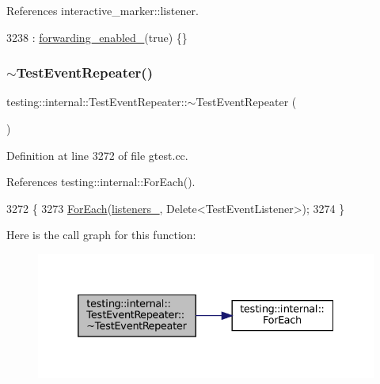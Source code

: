 References interactive\+\_\+marker\+::listener.


\begin{DoxyCode}
3238 : \hyperlink{classtesting_1_1internal_1_1TestEventRepeater_a1f7e494642d653eaad800504510d18a3}{forwarding\_enabled\_}(\textcolor{keyword}{true}) \{\}
\end{DoxyCode}
\mbox{\label{classtesting_1_1internal_1_1TestEventRepeater_a0f7129002fc4a33e29ce76a3b6df8d1b}} 
\subsubsection{\texorpdfstring{$\sim$\+Test\+Event\+Repeater()}{~TestEventRepeater()}}
{\footnotesize\ttfamily testing\+::internal\+::\+Test\+Event\+Repeater\+::$\sim$\+Test\+Event\+Repeater (\begin{DoxyParamCaption}{ }\end{DoxyParamCaption})\hspace{0.3cm}{\ttfamily [virtual]}}



Definition at line 3272 of file gtest.\+cc.



References testing\+::internal\+::\+For\+Each().


\begin{DoxyCode}
3272                                       \{
3273   \hyperlink{namespacetesting_1_1internal_a52f5504ed65d116201ccb8f99a44fd7e}{ForEach}(\hyperlink{classtesting_1_1internal_1_1TestEventRepeater_a1c08e9302639108588d764b671c54825}{listeners\_}, Delete<TestEventListener>);
3274 \}
\end{DoxyCode}
Here is the call graph for this function\+:
\nopagebreak
\begin{figure}[H]
\begin{center}
\leavevmode
\includegraphics[width=332pt]{classtesting_1_1internal_1_1TestEventRepeater_a0f7129002fc4a33e29ce76a3b6df8d1b_cgraph}
\end{center}
\end{figure}


